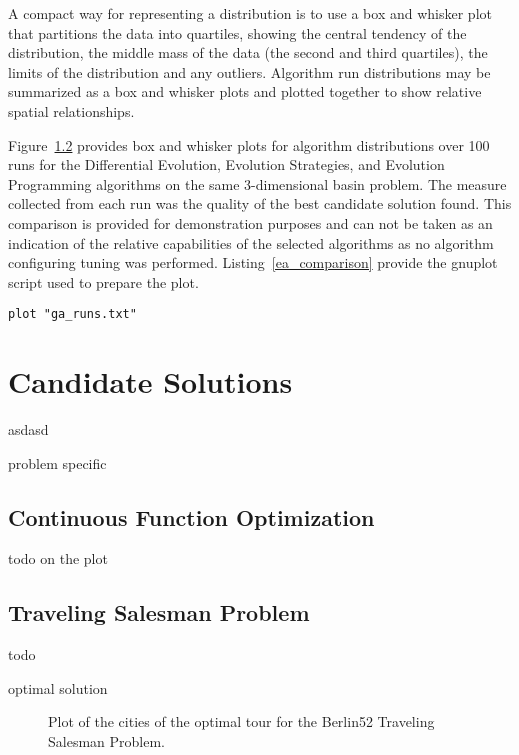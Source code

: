 \documentclass[a4paper, 11pt]{article}
\begin{document}
A compact way for representing a distribution is to use a box and whisker plot that partitions the data into quartiles, showing the central tendency of the distribution, the middle mass of the data (the second and third quartiles), the limits of the distribution and any outliers. Algorithm run distributions may be summarized as a box and whisker plots and plotted together to show relative spatial relationships.

Figure~\ref{} provides box and whisker plots for algorithm distributions over 100 runs for the Differential Evolution, Evolution Strategies, and Evolution Programming algorithms on the same 3-dimensional basin problem. The measure collected from each run was the quality of the best candidate solution found. This comparison is provided for demonstration purposes and can not be taken as an indication of the relative capabilities of the selected algorithms as no algorithm configuring tuning was performed. Listing~\ref{ea_comparison} provide the gnuplot script used to prepare the plot.


\begin{lstlisting}[caption=Boxplots of the best solutions found by DE ES and EP algorithms on a 3-dimensional basin problem over 100 runs, label=ea_comparison]
plot "ga_runs.txt"
\end{lstlisting}

%
%
\section{Candidate Solutions}
asdasd

problem specific

\subsection{Continuous Function Optimization}
todo
on the plot

\subsection{Traveling Salesman Problem}
todo


optimal solution

\begin{figure}[htp]

\caption{Plot of the cities of the optimal tour for the Berlin52 Traveling Salesman Problem.}
\label{plot:tsp2}
\end{figure}
\end{document}
